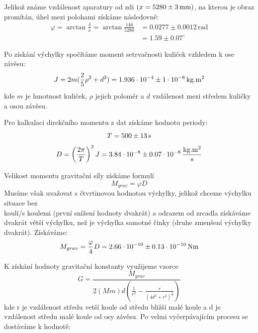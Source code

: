 \documentclass[czech,11pt,a4paper]{article}
\begin{document}
		Jelikož známe vzdálenost aparatury od zdi $(x = 5280 \pm 3 \,\rm mm)$, na kterou je obraz promítán, úhel mezi polohami získáme následovně:
		\begin{align*}
			\varphi = \arctan \frac{\delta}{x} = \arctan \frac{146}{5280} &= 0.0277 \pm 0.0012 \,\text{rad} \\ 
			&= 1.59 \pm 0.07^\circ
		\end{align*}
		
		Po získání výchylky spočítáme moment setrvačnosti kuliček vzhledem k ose závěsu:
		\begin{equation}
			J = 2m (\frac 2 5 \rho ^2 + d^2) = 1.936\cdot10^{-4} \pm 1\cdot10^{-6}\,\rm kg.m^2
		\end{equation}
		kde $m$ je hmotnost kuliček, $\rho$ jejich poloměr a $d$ vzdálenost mezi středem kuličky a osou závěsu.
		
		Pro kalkulaci direkčního momentu z dat získáme hodnotu periody:
		\begin{equation*}
			T = 500 \pm 13 \,\rm s
		\end{equation*}
		\begin{equation}
			D = \left(\frac{2 \pi}{T}\right)^2 J = 3.84 \cdot 10^{-8} \pm 0.07 \cdot 10^{-8} \,\rm \frac{kg.m^2}{s}
		\end{equation}
		
		Velikost momentu gravitační síly získáme formulí
		\begin{equation}
			M_{grav} = \varphi D 
		\end{equation}
		Musíme však uvažovat s čtvrtinovou hodnotou výchylky, jelikož chceme výchylku situace bez \\koulí/s koulemi (první snížení hodnoty dvakrát) a odrazem od zrcadla získáváme dvakrát větší výchylku, než je výchylka samotné činky (druhe zmenšení výchylky dvakrát). Získáváme:
		\begin{equation}
			M_{grav} = \frac \varphi 4 D = 2.66 \cdot 10^{-10} \pm 0.13 \cdot 10^{-10} \,\rm N m
		\end{equation}
		
		K získání hodnoty gravitační konstanty využijeme vzorce
		\begin{equation}
			G = \frac{M_{grav}}{2 (Mm)d(\frac{1}{r^2}-\frac{r}{(4d^2+r^2)^\frac{3}{2}})}
		\end{equation}
	 kde r je vzdálenost středu vetší koule od středu bližší malé koule a d je vzdálenost středu malé koule od osy závěsu. Po velmi vyčerpávajícím procesu se dostáváme k hodnotě:
	 
\end{document}
